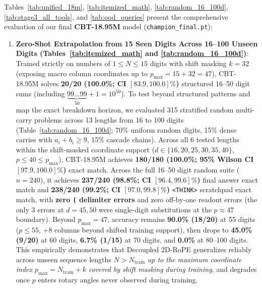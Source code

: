 \documentclass[10pt,twocolumn]{article}
\begin{document}
Tables~\ref{tab:unified_18m}, \ref{tab:itemized_math}, \ref{tab:random_16_100d}, \ref{tab:stage3_all_tools}, and \ref{tab:ood_queries} present the comprehensive evaluation of our final \textbf{CBT-18.95M} model (\texttt{champion\_final.pt}):
\begin{enumerate}[leftmargin=*,nosep]
    \item \textbf{Zero-Shot Extrapolation from 15 Seen Digits Across 16--100 Unseen Digits (Tables~\ref{tab:itemized_math} and \ref{tab:random_16_100d})}: Trained strictly on numbers of $1 \le N \le 15$ digits with shift masking $k=32$ (exposing macro column coordinates up to $p_{\max} = 15 + 32 = 47$), CBT-18.95M solves \textbf{20/20 (100.0\%; CI $[83.9, 100.0]\%$)} structured 16--50 digit sums (including $\underbrace{99\dots99}_{50} + 1 = 10^{50}$). To test beyond structured patterns and map the exact breakdown horizon, we evaluated 315 stratified random multi-carry problems across 13 lengths from 16 to 100 digits (Table~\ref{tab:random_16_100d}; 70\% uniform random digits, 15\% dense carries with $a_i + b_i \ge 9$, 15\% cascade chains). Across all 6 tested lengths within the shift-masked coordinate support ($d \in \{16, 20, 25, 30, 35, 40\}$, $p \le 40 \le p_{\max}$), CBT-18.95M achieves \textbf{180/180 (100.0\%; 95\% Wilson CI $[97.9, 100.0]\%$)} exact match. Across the full 16--50 digit random suite ($n = 240$), it achieves \textbf{237/240 (98.8\%; CI $[96.4, 99.6]\%$)} final answer exact match and \textbf{238/240 (99.2\%; CI $[97.0, 99.8]\%$)} \texttt{<THINK>} scratchpad exact match, with \textbf{zero \texttt{(} delimiter errors} and zero off-by-one readout errors (the only 3 errors at $d=45, 50$ were single-digit substitutions at the $p \approx 47$ boundary). Beyond $p_{\max} = 47$, accuracy remains \textbf{90.0\% (18/20)} at 55 digits ($p \le 55$, $+8$ columns beyond shifted training support), then drops to \textbf{45.0\% (9/20)} at 60 digits, \textbf{6.7\% (1/15)} at 70 digits, and \textbf{0.0\%} at 80--100 digits. This empirically demonstrates that Decoupled 2D-RoPE generalizes reliably across unseen sequence lengths $N > N_{\text{train}}$ \emph{up to the maximum coordinate index $p_{\max} = N_{\text{train}} + k$ covered by shift masking during training}, and degrades once $p$ enters rotary angles never observed during training.

\end{enumerate}
\end{document}

